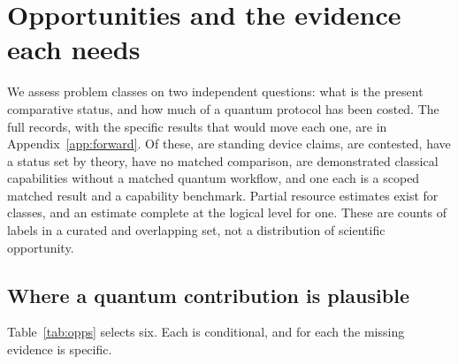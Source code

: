 \section{Opportunities and the evidence each needs}
\label{sec:opps}

We assess \nClasses{} problem classes on two independent questions: what is the present comparative status, and how much of a quantum protocol has been costed. The full records, with the specific results that would move each one, are in Appendix~\ref{app:forward}. Of these, \nFstanding{} are standing device claims, \nFcontested{} are contested, \nFtheory{} have a status set by theory, \nFnotcompared{} have no matched comparison, \nFclasscap{} are demonstrated classical capabilities without a matched quantum workflow, and one each is a scoped matched result and a capability benchmark. Partial resource estimates exist for \nMpartial{} classes, and an estimate complete at the logical level for one. These are counts of labels in a curated and overlapping set, not a distribution of scientific opportunity.

\subsection{Where a quantum contribution is plausible}
Table~\ref{tab:opps} selects six. Each is conditional, and for each the missing evidence is specific.

